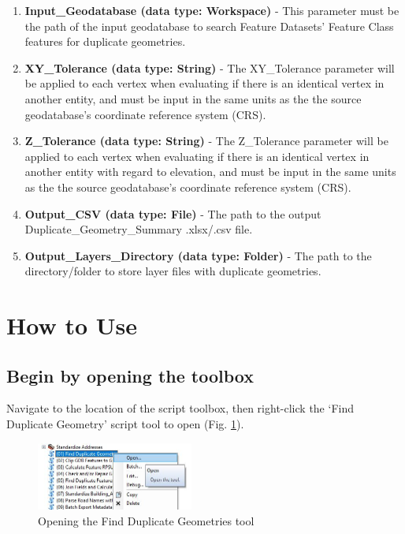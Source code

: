 \documentclass[openany]{book}
\providecommand{\tightlist}{%
  \setlength{\itemsep}{0pt}\setlength{\parskip}{0pt}}
\theoremstyle{definition}
\theoremstyle{definition}
\theoremstyle{definition}
\theoremstyle{remark}
\begin{document}
\begin{enumerate}
\def\labelenumi{\arabic{enumi}.}
\tightlist
\item
  \textbf{Input\_Geodatabase (data type: Workspace)} - This parameter
  must be the path of the input geodatabase to search Feature Datasets'
  Feature Class features for duplicate geometries.\\
\item
  \textbf{XY\_Tolerance (data type: String)} - The XY\_Tolerance
  parameter will be applied to each vertex when evaluating if there is
  an identical vertex in another entity, and must be input in the same
  units as the the source geodatabase's coordinate reference system
  (CRS).
\item
  \textbf{Z\_Tolerance (data type: String)} - The Z\_Tolerance parameter
  will be applied to each vertex when evaluating if there is an
  identical vertex in another entity with regard to elevation, and must
  be input in the same units as the the source geodatabase's coordinate
  reference system (CRS).
\item
  \textbf{Output\_CSV (data type: File)} - The path to the output
  Duplicate\_Geometry\_Summary .xlsx/.csv file.
\item
  \textbf{Output\_Layers\_Directory (data type: Folder)} - The path to
  the directory/folder to store layer files with duplicate geometries.
\end{enumerate}

\section{How to Use}\label{how-to-use-3}

\subsection{Begin by opening the
toolbox}\label{begin-by-opening-the-toolbox-3}

Navigate to the location of the script toolbox, then right-click the
`Find Duplicate Geometry' script tool to open (Fig. \ref{fig:dupGopen}).

\begin{figure}[H]

{\centering \includegraphics[width=2.03in,]{figures/dupG-opentool} 

}

\caption{Opening the Find Duplicate Geometries tool}\label{fig:dupGopen}
\end{figure}
\end{document}
